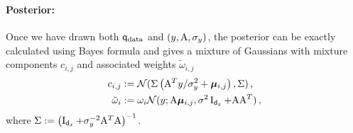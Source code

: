 \paragraph{Posterior:}
Once we have drawn both $\fwmarg{\mathrm{data}}{}$ and $(y, \mathrm{A}, \sigma_y)$, the posterior can be exactly calculated using Bayes formula and gives a mixture of Gaussians with mixture components $c_{i, j}$ and associated weights $\tilde{\omega}_{i, j}$
\begin{align*}
    c_{i, j} & := \mathcal{N}(\Sigma \left(\mathrm{A}^T y / \sigma_y^2 + \boldsymbol{\mu}_{i, j}\right), \Sigma) \,,\\
    \tilde{\omega}_i &:= \omega_i \mathcal{N}(y;\mathrm{A}\boldsymbol{\mu}_{i,j}, \sigma^2\operatorname{I}_{{\mathsf{d}_x}} + \mathrm{A} \mathrm{A}^T)\,,
\end{align*}
where $\Sigma := \left(\operatorname{I}_{{\mathsf{d}_x}} + \sigma_y^{-2} \mathrm{A}^T \mathrm{A}\right)^{-1}$.
